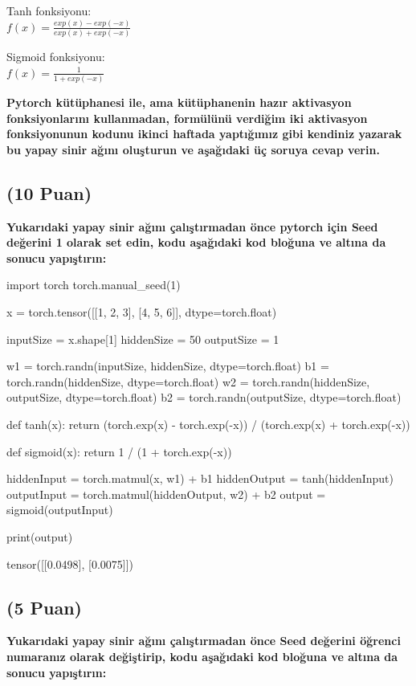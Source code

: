 \documentclass[11pt]{article}
\begin{document}
Tanh fonksiyonu:\\
$f(x) = \frac{exp(x) - exp(-x)}{exp(x) + exp(-x)}$
\vspace{.2in}

Sigmoid fonksiyonu:\\
$f(x) = \frac{1}{1 + exp(-x)}$

\vspace{.2in}
 \textbf{Pytorch kütüphanesi ile, ama kütüphanenin hazır aktivasyon fonksiyonlarını kullanmadan, formülünü verdiğim iki aktivasyon fonksiyonunun kodunu ikinci haftada yaptığımız gibi kendiniz yazarak bu yapay sinir ağını oluşturun ve aşağıdaki üç soruya cevap verin.}
 
\subsection{(10 Puan)} \textbf{Yukarıdaki yapay sinir ağını çalıştırmadan önce pytorch için Seed değerini 1 olarak set edin, kodu aşağıdaki kod bloğuna ve altına da sonucu yapıştırın:}

\begin{python}
import torch
torch.manual_seed(1)

x = torch.tensor([[1, 2, 3], [4, 5, 6]], dtype=torch.float)

inputSize = x.shape[1]
hiddenSize = 50
outputSize = 1

w1 = torch.randn(inputSize, hiddenSize, dtype=torch.float)
b1 = torch.randn(hiddenSize, dtype=torch.float)
w2 = torch.randn(hiddenSize, outputSize, dtype=torch.float)
b2 = torch.randn(outputSize, dtype=torch.float)

def tanh(x):
    return (torch.exp(x) - torch.exp(-x)) / (torch.exp(x) + torch.exp(-x))

def sigmoid(x):
    return 1 / (1 + torch.exp(-x))

hiddenInput = torch.matmul(x, w1) + b1
hiddenOutput = tanh(hiddenInput)
outputInput = torch.matmul(hiddenOutput, w2) + b2
output = sigmoid(outputInput)

print(output)
\end{python}

tensor([[0.0498],
        [0.0075]])

\subsection{(5 Puan)} \textbf{Yukarıdaki yapay sinir ağını çalıştırmadan önce Seed değerini öğrenci numaranız olarak değiştirip, kodu aşağıdaki kod bloğuna ve altına da sonucu yapıştırın:}
\end{document}
